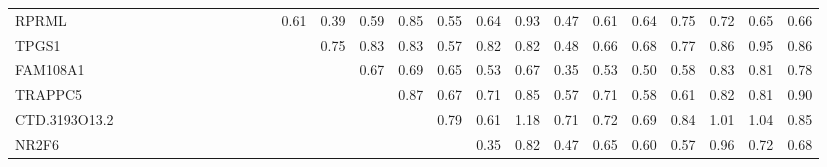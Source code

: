 \begin{longtable}{lrrrrrrrrrrrrrrrrrrrrrrrrr}
RPRML         &               &            &                &               &            &               &             &               &               &              &             &        0.61 &           0.39 &          0.59 &                0.85 &        0.55 &           0.64 &          0.93 &        0.47 &         0.61 &         0.64 &          0.75 &       0.72 &         0.65 &            0.66 \\
TPGS1         &               &            &                &               &            &               &             &               &               &              &             &             &           0.75 &          0.83 &                0.83 &        0.57 &           0.82 &          0.82 &        0.48 &         0.66 &         0.68 &          0.77 &       0.86 &         0.95 &            0.86 \\
FAM108A1      &               &            &                &               &            &               &             &               &               &              &             &             &                &          0.67 &                0.69 &        0.65 &           0.53 &          0.67 &        0.35 &         0.53 &         0.50 &          0.58 &       0.83 &         0.81 &            0.78 \\
TRAPPC5       &               &            &                &               &            &               &             &               &               &              &             &             &                &               &                0.87 &        0.67 &           0.71 &          0.85 &        0.57 &         0.71 &         0.58 &          0.61 &       0.82 &         0.81 &            0.90 \\
CTD.3193O13.2 &               &            &                &               &            &               &             &               &               &              &             &             &                &               &                     &        0.79 &           0.61 &          1.18 &        0.71 &         0.72 &         0.69 &          0.84 &       1.01 &         1.04 &            0.85 \\
NR2F6         &               &            &                &               &            &               &             &               &               &              &             &             &                &               &                     &             &           0.35 &          0.82 &        0.47 &         0.65 &         0.60 &          0.57 &       0.96 &         0.72 &            0.68 \\

\end{longtable}
